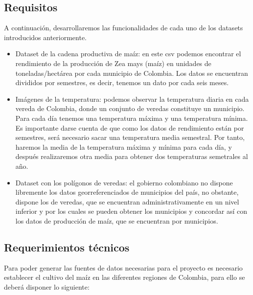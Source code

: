 \documentclass[12pt, spanish]{article}
\begin{document}

\subsection{Requisitos}

A continuación, desarrollaremos las funcionalidades de cada uno de los datasets introducidos anteriormente.

\begin{itemize}
    \item Dataset de la cadena productiva de maíz: en este csv podemos encontrar el rendimiento de la producción de Zea mays (maíz) en unidades de toneladas/hectárea por cada municipio de Colombia. Los datos se encuentran divididos por semestres, es decir, tenemos un dato por cada seis meses.
    
    \item Imágenes de la temperatura: podemos observar la temperatura diaria en cada vereda de Colombia, donde un conjunto de veredas constituye un municipio. Para cada día tenemos una temperatura máxima y una temperatura mínima. Es importante darse cuenta de que como los datos de rendimiento están por semestres, será necesario sacar una temperatura media semestral. Por tanto, haremos la media de la temperatura máxima y mínima para cada día, y después realizaremos otra media para obtener dos temperaturas semetrales al año.
    
    \item Dataset con los polígonos de veredas: el gobierno colombiano no dispone libremente los datos georreferenciados de municipios del país, no obstante, dispone los de veredas, que se encuentran administrativamente en un nivel inferior y por los cuales se pueden obtener los municipios y concordar así con los datos de producción de maíz, que se encuentran por municipios.
\end{itemize}


\subsection{Requerimientos técnicos}
Para poder generar las fuentes de datos necesarias para el proyecto es necesario establecer el cultivo del maíz en las diferentes regiones de Colombia, para ello se deberá disponer lo siguiente:
\end{document}

